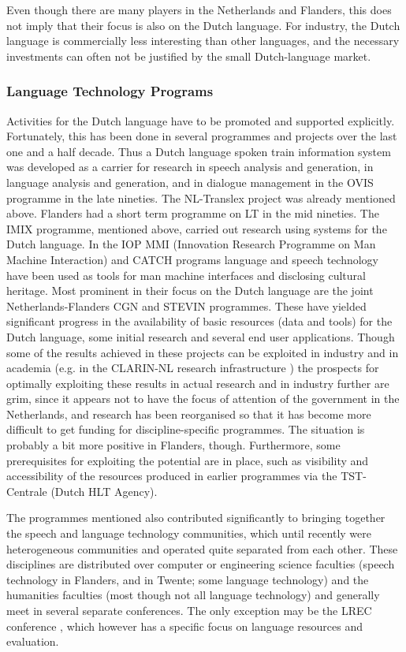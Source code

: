 \documentclass[]{../../metanetpaper}
\begin{document}
\begin{multicols}{2}
    Even though there are many players in the Netherlands and Flanders, this does not imply that their focus is also on the Dutch language. For industry, the Dutch language is commercially less interesting than other languages, and the necessary investments can often not be justified by the small Dutch-language market.
    
\subsubsection{Language Technology Programs}

  Activities for the Dutch language have to be promoted and supported explicitly. Fortunately, this has been done in several programmes and projects over the last one and a half decade. Thus a Dutch language spoken train information system was developed as a carrier for research in speech analysis and generation, in language analysis and generation, and in dialogue management in the OVIS programme in the late nineties. The NL-Translex project was already mentioned above. Flanders had a short term programme on LT in the mid nineties. The IMIX programme, mentioned above, carried out research using systems for the Dutch language.  In the IOP MMI (Innovation Research Programme on Man Machine Interaction) and CATCH \cite{CATCH} programs language and speech technology have been used as tools for man machine interfaces and disclosing cultural heritage. Most prominent in their focus on the Dutch language are the joint Netherlands-Flanders CGN and STEVIN programmes. These have yielded significant progress in the availability of basic resources (data and tools) for the Dutch language, some initial research and several end user applications. Though some of the results achieved in these projects can be exploited in industry and in academia (e.g. in the CLARIN-NL research infrastructure \cite{CLARIN-NL} ) the prospects for optimally exploiting these results in actual research and in industry further are grim, since it appears not to have the focus of attention of the government in the Netherlands, and research has been reorganised so that it has become more difficult to get funding for discipline-specific programmes. The situation is probably a bit more positive in Flanders, though. Furthermore, some prerequisites for exploiting the potential are in place, such as visibility and accessibility of the resources produced in earlier programmes via the TST-Centrale (Dutch HLT Agency).

  The programmes mentioned also contributed significantly to bringing together the speech and language technology communities, which until recently were heterogeneous communities and operated quite separated from each other. These disciplines are distributed over computer or engineering science faculties (speech technology in Flanders, and in Twente; some language technology) and the humanities faculties (most though not all language technology) and generally meet in several separate conferences. The only exception may be the LREC conference \cite{LREC}, which however has a specific focus on language resources and evaluation.


\end{multicols}
\end{document}
